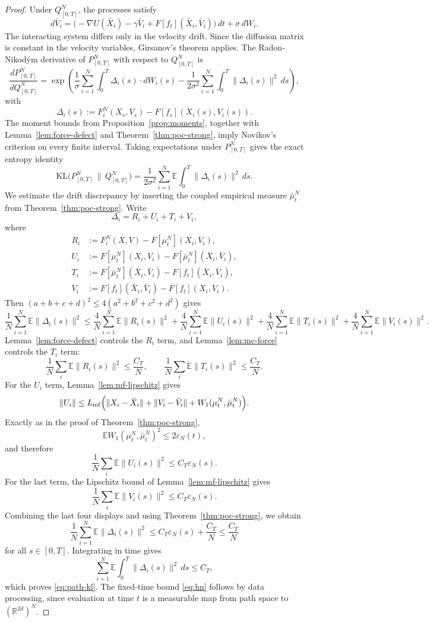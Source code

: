 \documentclass[11pt]{article}
\theoremstyle{definition}
\theoremstyle{remark}
\newcommand{\R}{\mathbb{R}}
\newcommand{\E}{\mathbb{E}}
\newcommand{\KL}{\mathrm{KL}}
\begin{document}
\begin{proof}
Under $Q_{[0,T]}^N$, the processes satisfy
\[
d\bar V_i=
\bigl(-\nabla U(\bar X_i)-\gamma \bar V_i+F[f_t](\bar X_i,\bar V_i)\bigr)\,dt
+\sigma\,dW_i.
\]
The interacting system differs only in the velocity drift. Since the diffusion
matrix is constant in the velocity variables, Girsanov's theorem applies. The
Radon-Nikod\'ym derivative of $P_{[0,T]}^N$ with respect to $Q_{[0,T]}^N$ is
\[
\frac{dP_{[0,T]}^N}{dQ_{[0,T]}^N}
=
\exp\!\left(
\frac{1}{\sigma}\sum_{i=1}^N \int_0^T \Delta_i(s)\cdot dW_i(s)
-\frac{1}{2\sigma^2}\sum_{i=1}^N \int_0^T \|\Delta_i(s)\|^2\,ds
\right),
\]
with
\[
\Delta_i(s):=F_i^N(X_s,V_s)-F[f_s](X_i(s),V_i(s)).
\]
The moment bounds from Proposition~\ref{prop:moments}, together with
Lemma~\ref{lem:force-defect} and Theorem~\ref{thm:poc-strong}, imply Novikov's
criterion on every finite interval. Taking expectations under $P_{[0,T]}^N$
gives the exact entropy identity
\[
\KL\bigl(P_{[0,T]}^N\,\|\,Q_{[0,T]}^N\bigr)
=
\frac{1}{2\sigma^2}
\sum_{i=1}^N \E \int_0^T \|\Delta_i(s)\|^2\,ds.
\]
We estimate the drift discrepancy by inserting the coupled empirical measure
$\bar\mu_t^N$ from Theorem~\ref{thm:poc-strong}. Write
\[
\Delta_i=R_i+U_i+T_i+V_i,
\]
where
\begin{align*}
R_i&:=F_i^N(X,V)-F[\mu_t^N](X_i,V_i),\\
U_i&:=F[\mu_t^N](X_i,V_i)-F[\bar\mu_t^N](\bar X_i,\bar V_i),\\
T_i&:=F[\bar\mu_t^N](\bar X_i,\bar V_i)-F[f_t](\bar X_i,\bar V_i),\\
V_i&:=F[f_t](\bar X_i,\bar V_i)-F[f_t](X_i,V_i).
\end{align*}
Then $(a+b+c+d)^2\leq 4(a^2+b^2+c^2+d^2)$ gives
\[
\frac1N\sum_{i=1}^N \E\|\Delta_i(s)\|^2
\leq
\frac{4}{N}\sum_{i=1}^N \E\|R_i(s)\|^2
+\frac{4}{N}\sum_{i=1}^N \E\|U_i(s)\|^2
+\frac{4}{N}\sum_{i=1}^N \E\|T_i(s)\|^2
+\frac{4}{N}\sum_{i=1}^N \E\|V_i(s)\|^2.
\]
Lemma~\ref{lem:force-defect} controls the $R_i$ term, and
Lemma~\ref{lem:mc-force} controls the $T_i$ term:
\[
\frac1N\sum_i \E\|R_i(s)\|^2
\leq \frac{C_T}{N},
\qquad
\frac1N\sum_i \E\|T_i(s)\|^2
\leq \frac{C_T}{N}.
\]
For the $U_i$ term, Lemma~\ref{lem:mf-lipschitz} gives
\[
\|U_i\|
\leq
L_{\mathrm{mf}}
\Bigl(\|X_i-\bar X_i\|+\|V_i-\bar V_i\|+W_1(\mu_t^N,\bar\mu_t^N)\Bigr).
\]
Exactly as in the proof of Theorem~\ref{thm:poc-strong},
\[
\E W_1(\mu_t^N,\bar\mu_t^N)^2\leq 2\varepsilon_N(t),
\]
and therefore
\[
\frac1N\sum_i \E\|U_i(s)\|^2\leq C_T\varepsilon_N(s).
\]
For the last term, the Lipschitz bound of Lemma~\ref{lem:mf-lipschitz} gives
\[
\frac1N\sum_i \E\|V_i(s)\|^2\leq C_T\varepsilon_N(s).
\]
Combining the last four displays and using Theorem~\ref{thm:poc-strong}, we obtain
\[
\frac1N\sum_{i=1}^N \E\|\Delta_i(s)\|^2
\leq
C_T\varepsilon_N(s)+\frac{C_T}{N}
\leq
\frac{C_T}{N}
\]
for all $s\in[0,T]$. Integrating in time gives
\[
\sum_{i=1}^N \E \int_0^T \|\Delta_i(s)\|^2\,ds
\leq
C_T,
\]
which proves \eqref{eq:path-kl}. The fixed-time bound \eqref{eq:hn} follows by
data processing, since evaluation at time $t$ is a measurable map from path
space to $(\R^{2d})^N$.
\end{proof}
\end{document}
